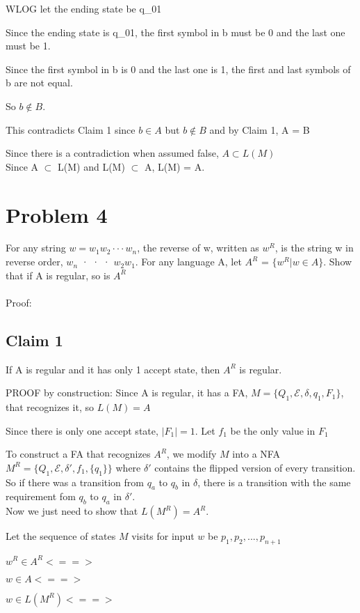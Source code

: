 \documentclass[letterpaper, 11pt]{article}
\begin{document}
WLOG let the ending state be q\_01

Since the ending state is q\_01, the first symbol in b must be 0 and the last one must be 1.

Since the first symbol in b is 0 and the last one is 1, the first and last symbols of b are not equal.

So $b \notin B$.

This contradicts Claim 1 since $b \in A$ but $b \notin B$ and by Claim 1, A = B

Since there is a contradiction when assumed false, $A \subset L(M)$\\

Since A $\subset$ L(M) and L(M) $\subset$ A, L(M) = A.
\newpage
\section{Problem 4}
For any string $w = w_1w_2 · · · w_n$, the reverse of w, written as $w^R$, is the string w in reverse
order, $w_n$ · · · $w_2w_1$. For any language A, let $A^R$ = $\{w^R|w \in A\}$. Show that if A is regular, so is $A^R$\\\\
Proof:

\subsection*{Claim 1}
If A is regular and it has only 1 accept state, then $A^R$ is regular.

PROOF by construction:
Since A is regular, it has a FA, $M = \{Q_1, \mathcal{E}, \delta, q_1, F_1 \}$, that recognizes it, so $L(M) = A$

Since there is only one accept state, $|F_1| = 1$. Let $f_1$ be the only value in $F_1$

To construct a FA that recognizes $A^R$, we modify $M$ into a NFA $M^R = \{Q_1, \mathcal{E}, \delta', f_1, \{q_1\}\}$ where $\delta'$ contains the flipped version of every transition.
So if there was a transition from $q_a$ to $q_b$ in $\delta$, there is a transition with the same requirement fom $q_b$ to $q_a$ in $\delta'$.\\
Now we just need to show that $L(M^R) = A^R$.

Let the sequence of states $M$ visits for input $w$ be $p_1, p_2, ..., p_{n+1}$

$w^R \in A^R <==>$ 

$w \in A <==> $

$w \in L(M^R) <==> $
\end{document}
